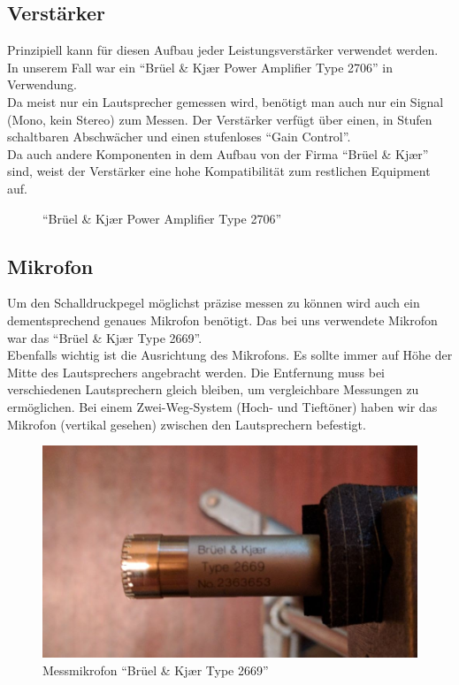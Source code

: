 \newpage
\subsection{Verstärker}\label{subsec:5.2.3}
Prinzipiell kann für diesen Aufbau jeder Leistungsverstärker verwendet werden. In unserem Fall war ein \enquote{Brüel \& Kj\ae r Power Amplifier Type 2706} in Verwendung.\\
Da meist nur ein Lautsprecher gemessen wird, benötigt man auch nur ein Signal (Mono, kein Stereo) zum Messen. Der Verstärker verfügt über einen, in Stufen schaltbaren Abschwächer und einen stufenloses \enquote{Gain Control}.\\
Da auch andere Komponenten in dem Aufbau von der Firma  \enquote{Brüel \& Kj\ae r} sind, weist der Verstärker eine hohe Kompatibilität zum restlichen Equipment auf.
\begin{figure} [H]
	\centering
	\caption{\enquote{Brüel \& Kj\ae r Power Amplifier Type 2706}}
	\label{fig:5.2.3.1}
\end{figure}

\subsection{Mikrofon}\label{subsec:5.2.4}
Um den Schalldruckpegel möglichst präzise messen zu können wird auch ein dementsprechend genaues Mikrofon benötigt. Das bei uns verwendete Mikrofon war das \enquote{Brüel \& Kj\ae r Type 2669}. \\
Ebenfalls wichtig ist die Ausrichtung des Mikrofons. Es sollte immer auf Höhe der Mitte des Lautsprechers angebracht werden. Die Entfernung muss bei verschiedenen Lautsprechern gleich bleiben, um vergleichbare Messungen zu ermöglichen. Bei einem Zwei-Weg-System (Hoch- und Tieftöner) haben wir das Mikrofon (vertikal gesehen) zwischen den Lautsprechern befestigt.
\begin{figure} [H]
	\centering
	\includegraphics[width=1\textwidth]{img/LSMessung/mikro.png}
	\caption{Messmikrofon \enquote{Brüel \& Kj\ae r Type 2669}}
	\label{fig:5.2.4.1}
\end{figure}